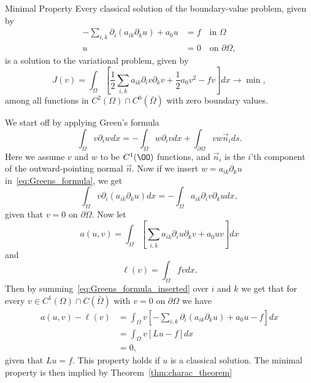 \begin{thmx}{Minimal Property}
    Every classical solution of the boundary-value problem, given by
\begin{align}
    -\sum_{i,k} \partial_i (a_{ik}\partial_k u) + a_0 u &= f \quad \text{in } \Omega  \\
    u &= 0 \quad \text{on } \partial \Omega,
\end{align}
    is a solution to the variational problem, given by
    \[
        J(v)=\int_\Omega \left [\frac{1}{2}\sum_{i,k} a_{ik} \partial_i v\partial_k v + \frac{1}{2} a_0 v^2 -fv\right ]dx \longrightarrow \min,
    \]
    among all functions in $C^2(\Omega)\cap C^0(\bar{\Omega})$ with zero boundary values.
    \label{thm:minimal_property} 
\end{thmx}
\begin{bev}
    We start off by applying Green's formula
    \begin{equation}
    \label{eq:Greens_formula}
        \int_\Omega v\partial_i w dx = -\int_\Omega w \partial_i v dx + \int_{\partial \Omega} v w \vec{n}_i ds.
    \end{equation}
    Here we assume $v$ and $w$ to be $C^1(\OO)$ functions, and $\vec{n}_i$ is the $i$'th component of the outward-pointing normal $\vec{n}$.
    Now if we insert $w=a_{ik}\partial_k u$ in~\eqref{eq:Greens_formula}, we get
    \begin{equation}
    \label{eq:Greens_formula_inserted}
        \int_\Omega v\partial_i (a_{ik} \partial_k u) dx = -\int_\Omega a_{ik} \partial_i v\partial_k u dx,
    \end{equation}
    given that $v=0$ on $\partial \Omega$.
    Now let 
    \begin{equation}
    \label{eq:a(u,v)}
        a(u,v) = \int_\Omega \left[\sum_{i,k} a_{ik} \partial_i u \partial_k v +a_0 uv \right]dx
    \end{equation}
    and
    \begin{equation}
    \label{eq:l(v)}
        \ell(v) = \int_\Omega fv dx.
    \end{equation}
    Then by summing~\eqref{eq:Greens_formula_inserted} over $i$ and $k$ we get that for every $v\in C^1(\Omega) \cap C(\bar{\Omega})$ with $v=0$ on $\partial \Omega$ we have
    \begin{align}
        a(u,v) - \ell(v) &= \int_\Omega v\left[ -\sum_{i,k} \partial_i (a_{ik} \partial_k u) + a_0 u - f \right] dx \label{eq:min_prop_variational_problem}\\
        &= \int_\Omega v [Lu - f] dx \nonumber \\
        &= 0, \nonumber
    \end{align}
    given that $Lu = f$. This property holds if $u$ is a classical solution.
     The minimal property is then implied by Theorem~\ref{thm:charac_theorem}
\end{bev}